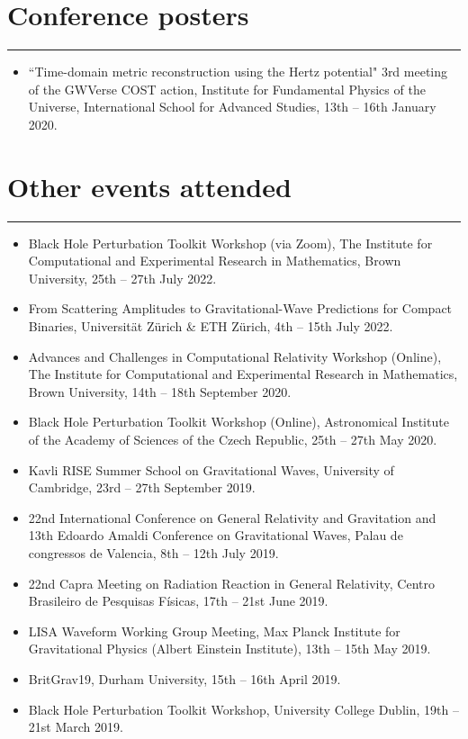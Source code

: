 \documentclass[10.5pt, oneside]{article}   	%
\begin{document}
{\color{Sectioncolour}
\section*{Conference posters}
\vspace{-3mm}
\noindent\rule{\linewidth}{0.6pt}}
\begin{itemize}
\item ``Time-domain metric reconstruction using the Hertz potential" 3rd meeting of the GWVerse COST action, Institute for Fundamental Physics of the Universe, International School for Advanced Studies, 13th -- 16th January 2020.
\end{itemize} 

 
{\color{Sectioncolour}
\section*{Other events attended}
\vspace{-3mm}
\noindent\rule{\linewidth}{0.6pt}}
\begin{itemize}
\item Black Hole Perturbation Toolkit Workshop (via Zoom), The Institute for Computational and Experimental Research in Mathematics, Brown University, 25th -- 27th July 2022.
\item From Scattering Amplitudes to Gravitational-Wave Predictions for Compact Binaries, Universität Zürich \& ETH Zürich, 4th -- 15th July 2022.
\item Advances and Challenges in Computational Relativity Workshop (Online), The Institute for Computational and Experimental Research in Mathematics, Brown University, 14th -- 18th September 2020.
\item Black Hole Perturbation Toolkit Workshop (Online), Astronomical Institute of the Academy of Sciences of the Czech Republic, 25th -- 27th May 2020.
\item Kavli RISE Summer School on Gravitational Waves, University of Cambridge, 23rd -- 27th September 2019.
\item 22nd International Conference on General Relativity and Gravitation and 13th Edoardo Amaldi Conference on Gravitational Waves, Palau de congressos de Valencia, 8th -- 12th July 2019.
\item 22nd Capra Meeting on Radiation Reaction in General Relativity, Centro Brasileiro de Pesquisas Físicas, 17th -- 21st June 2019.
\item LISA Waveform Working Group Meeting, Max Planck Institute for Gravitational Physics (Albert Einstein Institute), 13th -- 15th May 2019.
\item BritGrav19, Durham University, 15th -- 16th April 2019.
\item Black Hole Perturbation Toolkit Workshop, University College Dublin, 19th -- 21st March 2019.
\end{itemize} 
\end{document}
